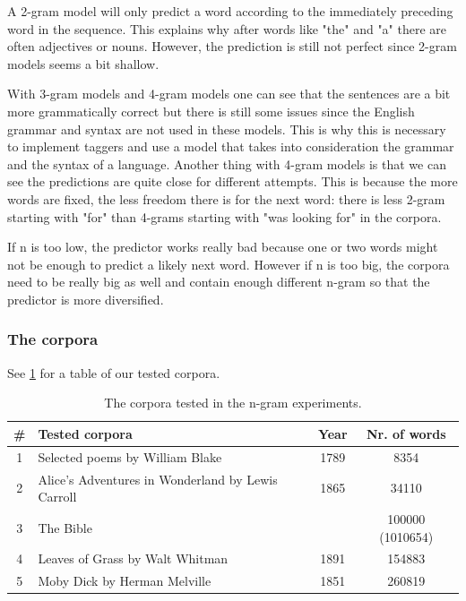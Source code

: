 \documentclass[a4paper,12pt]{article}
\begin{document}
A 2-gram model will only predict a word according to the immediately preceding word in the sequence. This explains why after words like "the" and "a" there are often adjectives or nouns. However, the prediction is still not perfect since 2-gram models seems a bit shallow.

With 3-gram models and 4-gram models one can see that the sentences are a bit more grammatically correct but there is still some issues since the English grammar and syntax are not used in these models. This is why this is necessary to implement taggers and use a model that takes into consideration the grammar and the syntax of a language. Another thing with 4-gram models is that we can see the predictions are quite close for different attempts. This is because the more words are fixed, the less freedom there is for the next word: there is less 2-gram starting with "for" than 4-grams starting with "was looking for" in the corpora.
	
If n is too low, the predictor works really bad because one or two words might not be enough to predict a likely next word. However if n is too big, the corpora need to be really big as well and contain enough different n-gram so that the predictor is more diversified.

\subsubsection{The corpora}
See \ref{tab:corpora1} for a table of our tested corpora.
\begin{table}
\begin{center}
\begin{tabular}{|c|l|c|c|}
\hline
\# & Tested corpora & Year & Nr. of words\\ \hline
1 & Selected poems by William Blake & 1789 & 8354 \\ \hline
2 & Alice's Adventures in Wonderland by Lewis Carroll & 1865 & 34110 \\ \hline
3 & The Bible & & 100000 (1010654) \\ \hline
4 & Leaves of Grass by Walt Whitman & 1891 & 154883\\ \hline
5 & Moby Dick by Herman Melville & 1851 & 260819\\ \hline


\end{tabular}
\caption{The corpora tested in the n-gram experiments.}
\label{tab:corpora1}
\end{center}
\end{table}
\end{document}

